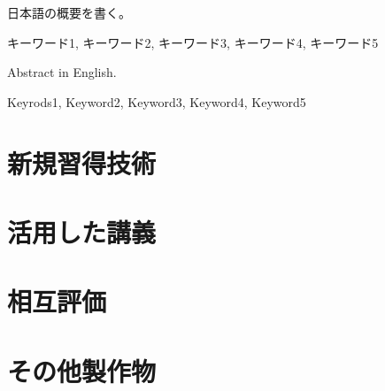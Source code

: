 \documentclass[openany,10pt,report]{ltjsbook}
\begin{document}
%
\maketitle

\frontmatter

\begin{jabstract} 日本語の概要を書く。
\begin{jkeyword}
キーワード1, キーワード2, キーワード3, キーワード4, キーワード5
\end{jkeyword}
\end{jabstract}

\begin{eabstract} Abstract in English. 
\begin{ekeyword}
Keyrods1, Keyword2, Keyword3, Keyword4, Keyword5
\end{ekeyword}
\end{eabstract}

\tableofcontents%

\mainmatter%

% 
% 
% 
% 
% 


\begin{appendix}

\chapter{新規習得技術}

\chapter{活用した講義}

\chapter{相互評価}

\chapter{その他製作物}

\end{appendix}




\end{document}
